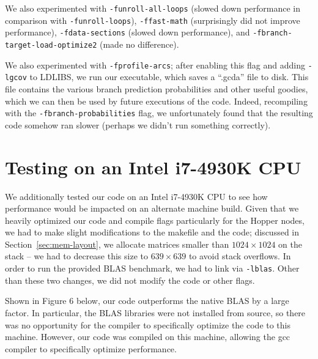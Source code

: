 \documentclass{article} %
\begin{document}
We also experimented with \texttt{-funroll-all-loops} (slowed down performance in
comparison with \texttt{-funroll-loops}), \texttt{-ffast-math} (surprisingly
did not improve performance), \texttt{-fdata-sections} (slowed down performance),
and \texttt{-fbranch-target-load-optimize2} (made no difference).

We also experimented with \texttt{-fprofile-arcs}; after enabling this
flag and adding \texttt{-lgcov} to LDLIBS, we run our executable, which saves a
``.gcda'' file to disk. This file contains the various branch prediction
probabilities and other useful goodies, which we can then be used by future
executions of the code. Indeed, recompiling with the
\texttt{-fbranch-probabilities} flag, we unfortunately found that the resulting
code somehow ran slower (perhaps we didn't run something correctly).

\section{Testing on an Intel i7-4930K CPU}
We additionally tested our code on an Intel i7-4930K CPU to see how performance
would be impacted on an alternate machine build. Given that we heavily optimized
our code and compile flags particularly for the Hopper nodes, we had to make
slight modifications to the makefile and the code; discussed in
Section~\ref{sec:mem-layout}, we allocate matrices smaller than $1024 \times 1024$
on the stack -- we had to decrease this size to $639\times 639$ to avoid stack
overflows.  In order to run the provided BLAS benchmark, we had to link via
\texttt{-lblas}. Other than these two changes, we did not modify the code or
other flags.

Shown in Figure 6 below, our code outperforms the native BLAS by a large factor.
In particular, the BLAS libraries were not installed from source, so there was no
opportunity for the compiler to specifically optimize the code to this machine.
However, our code was compiled on this machine, allowing the gcc compiler to
specifically optimize performance.

\small


\end{document}
